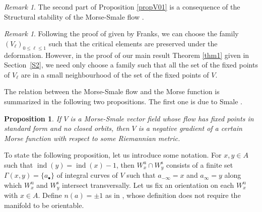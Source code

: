 \documentclass[11pt]{article}
\numberwithin{equation}{section}
\newcommand{\sbullet}{{\scriptscriptstyle\bullet}}
\newcommand{\rs}{\mathrm{s}}
\newcommand{\ru}{\mathrm{u}}
\theoremstyle{plain}
\newtheorem{prop}[lem]{Proposition}
\theoremstyle{definition}
\theoremstyle{remark}
\newtheorem{re}[lem]{Remark}
\DeclareMathOperator{\ind}{ind}
\let\l\leqslant
\begin{document}
\begin{re}
The second part of Proposition \ref{propV01} is a consequence of
the Structural stability of the Morse-Smale flow \cite{Palis68,PalisSmale70}.
\end{re}

\begin{re}\label{reVl}
Following the proof of \cite[Prop.\,1.6]{Franks1979}
given by Franks, we can choose the family $(V_{\ell})_{0\l
\ell \l1}$ such that the critical elements are preserved
under the deformation. However, in the proof of our main result
Theorem \ref{thm1} given in Section~\ref{S2}, we need only
choose a family such that all the set of the fixed points of
$V_{\ell}$ are in a small neighbourhood of the set of the fixed points of $V$.
\end{re}

The relation between the Morse-Smale flow and the Morse function is
summarized in the following two propositions. The first one is due to
Smale \cite[Th.\,B]{S61}.

\begin{prop}
If $V$ is a Morse-Smale vector field whose flow has fixed points
in standard form and no closed orbits, then $V$ is a negative gradient of
a certain Morse function with respect to some Riemannian metric.
\end{prop}

To state the following proposition, let us introduce some notation.
For $x,y\in A$ such that $\ind(y)=\ind(x)-1$, then $W^{\ru}_{x}\cap W^{\rs}_{y}$
consists of a finite set $\Gamma(x,y)=\{a_{\sbullet}\}$ of integral curves of
$V$ such that $a_{-\infty}=x$ and $a_{\infty}=y$ along
which $W^{\ru}_{x}$ and $W^{\rs}_{y}$ intersect transversally. Let us fix
an orientation on each $W^{\ru}_{x}$ with $x\in A$. Define
$n(a)=\pm1$ as in \cite[(1.28)]{BZ92}, whose definition does not
require the manifold to be orientable.
\end{document}
